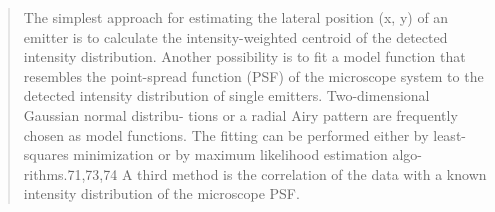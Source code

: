 \begin{quote}
    The simplest
    approach for estimating the lateral position (x, y) of an emitter
    is to calculate the intensity-weighted centroid of the detected
    intensity distribution. Another possibility is to fit a model
    function that resembles the point-spread function (PSF) of
    the microscope system to the detected intensity distribution
    of single emitters. Two-dimensional Gaussian normal distribu-
    tions or a radial Airy pattern are frequently chosen as model
    functions. The fitting can be performed either by least-squares
    minimization or by maximum likelihood estimation algo-
    rithms.71,73,74 A third method is the correlation of the data
    with a known intensity distribution of the microscope PSF. \cite{furstenberg_single-molecule_2013}
\end{quote}